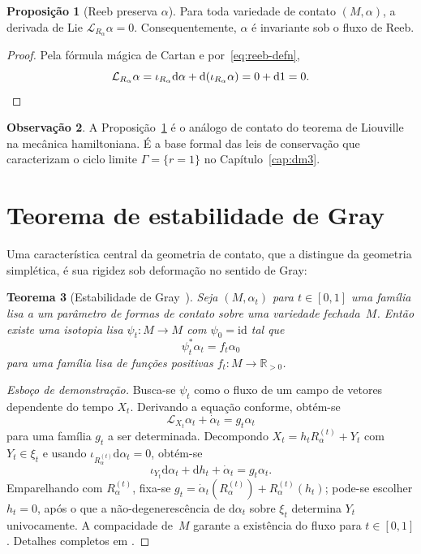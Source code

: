 \documentclass[12pt,a4paper,twoside]{book}
\theoremstyle{plain}
\newtheorem{teorema}{Teorema}[section]
\theoremstyle{definition}
\newtheorem{proposicao}[teorema]{Proposição}
\theoremstyle{definition}
\newtheorem{observacao}[teorema]{Observação}
\newcommand{\R}{\mathbb{R}}
\newcommand{\Reeb}{R_\alpha}
\newcommand{\Lie}{\mathcal{L}}
\newcommand{\dd}{\mathrm{d}}
\begin{document}
\begin{proposicao}[Reeb preserva $\alpha$]\label{prop:reeb-preserva}
Para toda variedade de contato $(M,\alpha)$, a derivada de Lie
$\Lie_{\Reeb}\alpha = 0$. Consequentemente, $\alpha$ é invariante sob
o fluxo de Reeb.
\end{proposicao}
\begin{proof}
Pela fórmula mágica de Cartan e por~\eqref{eq:reeb-defn},
\[
\Lie_{\Reeb}\alpha = \iota_{\Reeb}\dd\alpha + \dd(\iota_{\Reeb}\alpha) = 0 + \dd 1 = 0. \qedhere
\]
\end{proof}

\begin{observacao}
A Proposição~\ref{prop:reeb-preserva} é o análogo de contato do teorema de
Liouville na mecânica hamiltoniana. É a base formal das leis de conservação
que caracterizam o ciclo limite $\Gamma = \{r=1\}$ no Capítulo~\ref{cap:dm3}.
\end{observacao}

\section{Teorema de estabilidade de Gray}

Uma característica central da geometria de contato, que a distingue da
geometria simplética, é sua rigidez sob deformação no sentido de Gray:

\begin{teorema}[Estabilidade de Gray~\cite{Gray1959}]\label{thm:gray}
Seja $(M,\alpha_{t})$ para $t \in [0,1]$ uma família lisa a um parâmetro
de formas de contato sobre uma variedade fechada~$M$. Então existe uma
isotopia lisa $\psi_{t} : M \to M$ com $\psi_{0} = \mathrm{id}$ tal que
\[
  \psi_{t}^{\ast}\alpha_{t} = f_{t}\alpha_{0}
\]
para uma família lisa de funções positivas $f_{t} : M \to \R_{>0}$.
\end{teorema}

\begin{proof}[Esboço de demonstração]
Busca-se $\psi_{t}$ como o fluxo de um campo de vetores dependente do tempo
$X_{t}$. Derivando a equação conforme, obtém-se
\[
  \Lie_{X_{t}}\alpha_{t} + \dot{\alpha}_{t} = g_{t}\alpha_{t}
\]
para uma família $g_{t}$ a ser determinada. Decompondo
$X_{t} = h_{t}\Reeb^{(t)} + Y_{t}$ com $Y_{t}\in\xi_{t}$ e usando
$\iota_{\Reeb^{(t)}}\dd\alpha_{t}=0$, obtém-se
\[
  \iota_{Y_{t}}\dd\alpha_{t} + \dd h_{t} + \dot{\alpha}_{t} = g_{t}\alpha_{t}.
\]
Emparelhando com $\Reeb^{(t)}$, fixa-se
$g_{t} = \dot{\alpha}_{t}(\Reeb^{(t)}) + \Reeb^{(t)}(h_{t})$;
pode-se escolher $h_{t} = 0$, após o que a não-degenerescência de
$\dd\alpha_{t}$ sobre $\xi_{t}$ determina $Y_{t}$ univocamente.
A compacidade de~$M$ garante a existência do fluxo para $t\in[0,1]$.
Detalhes completos em \cite[Teorema 2.2.2]{Geiges2008}.
\end{proof}
\end{document}
